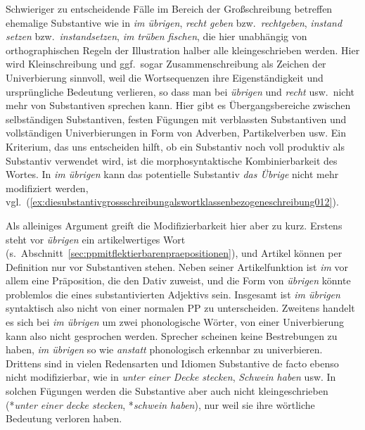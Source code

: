 Schwieriger zu entscheidende Fälle im Bereich der Großschreibung betreffen ehemalige Substantive wie in \textit{im übrigen}, \textit{recht geben} bzw.\ \textit{rechtgeben}, \textit{instand setzen} bzw.\ \textit{instandsetzen}, \textit{im trüben fischen}, die hier unabhängig von orthographischen Regeln der Illustration halber alle kleingeschrieben werden.
Hier wird Kleinschreibung und ggf.\ sogar Zusammenschreibung als Zeichen der Univerbierung sinnvoll, weil die Wortsequenzen ihre Eigenständigkeit und ursprüngliche Bedeutung verlieren, so dass man bei \textit{übrigen} und \textit{recht} usw.\ nicht mehr von Substantiven sprechen kann.
Hier gibt es Übergangsbereiche zwischen selbständigen Substantiven, festen Fügungen mit verblassten Substantiven und vollständigen Univerbierungen in Form von Adverben, Partikelverben usw.
Ein Kriterium, das uns entscheiden hilft, ob ein Substantiv noch voll produktiv als Substantiv verwendet wird, ist die morphosyntaktische Kombinierbarkeit des Wortes.
In \textit{im übrigen} kann \zB das potentielle Substantiv \textit{das Übrige} \zB nicht mehr modifiziert werden, vgl.\ (\ref{ex:diesubstantivgrossschreibungalswortklassenbezogeneschreibung012}).

\begin{exe}
  \ex\label{ex:diesubstantivgrossschreibungalswortklassenbezogeneschreibung012}
  \begin{xlist}
  \end{xlist}
\end{exe}

Als alleiniges Argument greift die Modifizierbarkeit hier aber zu kurz.
Erstens steht vor \textit{übrigen} ein artikelwertiges Wort (s.\ Abschnitt~\ref{sec:ppmitflektierbarenpraepositionen}), und Artikel können per Definition nur vor Substantiven stehen.
Neben seiner Artikelfunktion ist \textit{im} vor allem eine Präposition, die den Dativ zuweist, und die Form von \textit{übrigen} könnte problemlos die eines substantivierten Adjektivs sein.
Insgesamt ist \textit{im übrigen} syntaktisch also nicht von einer normalen PP zu unterscheiden.
Zweitens handelt es sich bei \textit{im übrigen} um zwei phonologische Wörter, von einer Univerbierung kann also nicht gesprochen werden.
Sprecher scheinen keine Bestrebungen zu haben, \textit{im übrigen} so wie \textit{anstatt} phonologisch erkennbar zu univerbieren.
Drittens sind in vielen Redensarten und Idiomen Substantive de facto ebenso nicht modifizierbar, wie \zB in \textit{unter einer Decke stecken}, \textit{Schwein haben} usw.
In solchen Fügungen werden die Substantive aber auch nicht kleingeschrieben (*\textit{unter einer decke stecken}, *\textit{schwein haben}), nur weil sie ihre wörtliche Bedeutung verloren haben.

